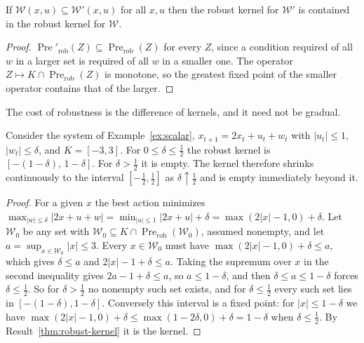 \begin{newresult}\label{prop:robust-monotone}
If $\mathcal W(x,u)\subseteq\mathcal W'(x,u)$ for all $x,u$ then the robust kernel for $\mathcal W'$ is contained in the robust kernel for $\mathcal W$.
\end{newresult}
\begin{proof}
$\operatorname{Pre}'_{\mathrm{rob}}(Z)\subseteq\operatorname{Pre}_{\mathrm{rob}}(Z)$ for every $Z$, since a condition required of all $w$ in a larger set is required of all $w$ in a smaller one. The operator $Z\mapsto K\cap\operatorname{Pre}_{\mathrm{rob}}(Z)$ is monotone, so the greatest fixed point of the smaller operator contains that of the larger.
\end{proof}

The cost of robustness is the difference of kernels, and it need not be gradual.

\begin{newresult}\label{prop:scalar-robust}
Consider the system of Example~\ref{ex:scalar}, $x_{t+1}=2x_t+u_t+w_t$ with $|u_t|\le1$, $|w_t|\le\delta$, and $K=[-3,3]$. For $0\le\delta\le\tfrac12$ the robust kernel is $[-(1-\delta),\,1-\delta]$. For $\delta>\tfrac12$ it is empty. The kernel therefore shrinks continuously to the interval $[-\tfrac12,\tfrac12]$ as $\delta\uparrow\tfrac12$ and is empty immediately beyond it.
\end{newresult}
\begin{proof}
For a given $x$ the best action minimizes $\max_{|w|\le\delta}|2x+u+w|=\min_{|u|\le1}|2x+u|+\delta=\max(2|x|-1,0)+\delta$. Let $\mathcal W_0$ be any set with $\mathcal W_0\subseteq K\cap\operatorname{Pre}_{\mathrm{rob}}(\mathcal W_0)$, assumed nonempty, and let $a=\sup_{x\in\mathcal W_0}|x|\le3$. Every $x\in\mathcal W_0$ must have $\max(2|x|-1,0)+\delta\le a$, which gives $\delta\le a$ and $2|x|-1+\delta\le a$. Taking the supremum over $x$ in the second inequality gives $2a-1+\delta\le a$, so $a\le1-\delta$, and then $\delta\le a\le1-\delta$ forces $\delta\le\tfrac12$. So for $\delta>\tfrac12$ no nonempty such set exists, and for $\delta\le\tfrac12$ every such set lies in $[-(1-\delta),1-\delta]$. Conversely this interval is a fixed point: for $|x|\le1-\delta$ we have $\max(2|x|-1,0)+\delta\le\max(1-2\delta,0)+\delta=1-\delta$ when $\delta\le\tfrac12$. By Result~\ref{thm:robust-kernel} it is the kernel.
\end{proof}

